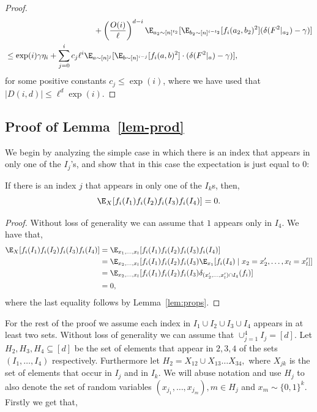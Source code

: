 \begin{proof}
\begin{align*}
& ~~~~~~~~~~~~~~~~~~~~~~~~~~~~~~~~~+\left(\frac{O(i)}{\ell}\right)^{d-i}\E_{a_2 \sim [n]^{t_2}}[\E_{b_2 \sim [n]^{i-t_2}}[f_i(a_2,b_2)^2](\delta(F^{ 2}|_{a_2}) - \gamma)] \\
&\leq \exp(i)\gamma \eta_i + \sum_{j = 0}^i c_j \ell^{i}\E_{a \sim [n]^{j}}[\E_{b \sim [n]^{i - j}}[f_i(a,b)^2]\cdot (\delta(F^{ 2}|_a) - \gamma)],  
\end{align*}
for some positive constants $c_j \leq \exp(i)$, where we have used that $|D(i,d)| \leq \ell^d \exp(i)$.
\end{proof}

\subsection{Proof of Lemma~\ref{lem-prod}}\label{sec:pf_lem-prod}
We begin by analyzing the simple case in which there is an index that appears in only one of the $I_j$'s, 
and show that in this case the expectation is just equal to $0$:
\begin{proposition}
If there is an index $j$ that appears in only one of the $I_k$s, then,
$$\E_X[ f_i(I_1) f_i(I_2) f_i(I_3) f_i(I_4)] = 0.$$
\end{proposition}

\begin{proof}
Without loss of generality we can assume that $1$ appears only in $I_4$. We have that,
\begin{align*}
\E_X[ f_i(I_1) f_i(I_2) f_i(I_3) f_i(I_4)] &= \E_{x_1,\ldots,x_l}[ f_i(I_1) f_i(I_2) f_i(I_3) f_i(I_4)] \\
&= \E_{x_2,\ldots,x_l}[f_i(I_1) f_i(I_2) f_i(I_3) \E_{x_1}[f_i(I_4) \mid x_2 = x_2',\ldots, x_l = x_l']]\\
&= \E_{x_2,\ldots,x_l}[f_i(I_1) f_i(I_2) f_i(I_3) \delta_{(x_2',\ldots,x_l') \cap I_4}(f_i)] \\
&= 0,
\end{align*}
where the last equality follows by Lemma~\ref{lem:props}. 
\end{proof}
For the rest of the proof we assume each index in $I_1\cup I_2\cup I_3\cup I_4$ appears in at least two sets. Without loss of generality we can assume that $\cup_{j = 1}^4 I_j = [d]$. Let $H_2, H_3, H_4 \subseteq [d]$ be the set of elements that appear in $2,3,4$ of the sets $(I_1,\ldots,I_4)$ respectively. Furthermore let $H_2 = X_{12} \cup X_{13} \ldots X_{34},$ where $X_{jk}$ is the set of elements that occur in $I_j$ and in $I_k$. We will abuse notation and use $H_j$ to also denote the set of random variables $(x_{j_1},\ldots, x_{j_m}), m \in H_j$ and $x_m \sim \{0,1\}^k$. Firstly we get that, 


